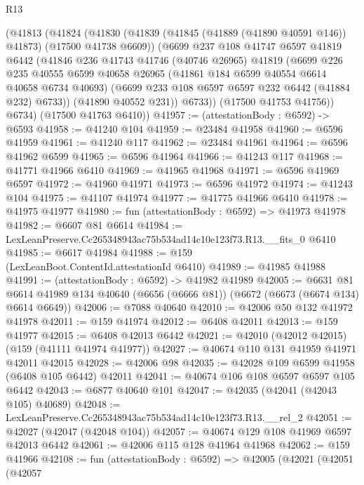 \begin{lexlean}{R13}
\begin{coremodule}
      (@41813
        (@41824
          (@41830
            (@41839 (@41845 (@41889 (@41890 @40591 @146)) @41873) (@17500 @41738 @6609))
            (@6699
              @237
              @108
              @41747
              @6597
              @41819
              @6442
              (@41846
                @236
                @41743
                @41746
                (@40746 @26965)
                @41819
                (@6699
                  @226
                  @235
                  @40555
                  @6599
                  @40658
                  @26965
                  (@41861 @184 @6599 @40554 @6614 @40658 @6734 @40693)
                  (@6699 @233 @108 @6597 @6597 @232 @6442 (@41884 @232) @6733))
                (@41890 @40552 @231))
              @6733))
          (@17500 @41753 @41756))
        @6734)
      (@17500 @41763 @6410))
@41957 := (attestationBody : @6592) -> @6593
@41958 := @41240 @104
@41959 := @23484 @41958
@41960 := @6596 @41959
@41961 := @41240 @117
@41962 := @23484 @41961
@41964 := @6596 @41962 @6599
@41965 := @6596 @41964
@41966 := @41243 @117
@41968 := @41771 @41966 @6410
@41969 := @41965 @41968
@41971 := @6596 @41969 @6597
@41972 := @41960 @41971
@41973 := @6596 @41972
@41974 := @41243 @104
@41975 := @41107 @41974
@41977 := @41775 @41966 @6410
@41978 := @41975 @41977
@41980 := fun (attestationBody : @6592) => @41973 @41978
@41982 := @6607 @81 @6614
@41984 := LexLeanPreserve.Cc265348943ac75b534ad14c10e123f73.R13.__fits_0 @6410
@41985 := @6617 @41984
@41988 := @159 (LexLeanBoot.ContentId.attestationId @6410)
@41989 := @41985 @41988
@41991 := (attestationBody : @6592) -> @41982 @41989
@42005 := @6631
    @81
    @6614
    @41989
    @134
    @40640
    (@6656 (@6666 @81))
    (@6672 (@6673 (@6674 @134) @6614 @6649))
@42006 := @7088 @40640
@42010 := @42006 @50 @132 @41972 @41978
@42011 := @159 @41974
@42012 := @6408 @42011
@42013 := @159 @41977
@42015 := @6408 @42013 @6442
@42021 := @42010 (@42012 @42015) (@159 (@41111 @41974 @41977))
@42027 := @40674 @110 @131 @41959 @41971 @42011 @42015
@42028 := @42006 @98
@42035 := @42028 @109 @6599 @41958 (@6408 @105 @6442) @42011
@42041 := @40674 @106 @108 @6597 @6597 @105 @6442
@42043 := @6877 @40640 @101
@42047 := @42035 (@42041 (@42043 @105) @40689)
@42048 := LexLeanPreserve.Cc265348943ac75b534ad14c10e123f73.R13.__rel_2
@42051 := @42027 (@42047 (@42048 @104))
@42057 := @40674 @129 @108 @41969 @6597 @42013 @6442
@42061 := @42006 @115 @128 @41964 @41968
@42062 := @159 @41966
@42108 := fun (attestationBody : @6592) =>
  @42005
    (@42021
      (@42051
        (@42057

\end{coremodule}
\end{lexlean}
